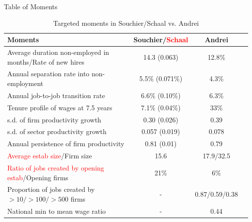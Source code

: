 \documentclass[9pt,aspectratio=169]{beamer} %
\begin{document}
\begin{frame}[noframenumbering]{Table of Moments}
    \begin{table}[h!]
\centering
\begin{tabular}{lccc}
\hline
Moments & Souchier/\textcolor{red}{Schaal} & Andrei \\
\hline
\hline
Average duration non-employed in months/Rate of new hires & 14.3 (0.063) &  12.8\%\\
\hline
Annual separation rate into non-employment & 5.5\% (0.071\%) & 4.3\% \\
\hline
Annual job-to-job transition rate & 6.6\% (0.10\%) & 6.3\% \\
\hline \hline
Tenure profile of wages at 7.5 years & 7.1\% (0.04\%) & 33\% \\

\hline \hline
s.d. of firm productivity growth & 0.30 (0.026) & 0.39 \\
\hline
s.d. of sector productivity growth & 0.057 (0.019) & 0.078 \\
\hline
Annual persistence of firm productivity & 0.81 (0.01) & 0.79 \\
\hline \hline
\textcolor{red}{Average estab size}/Firm size & 15.6& 17.9/32.5\\
\hline
\textcolor{red}{Ratio of jobs created by opening estab}/Opening firms & 21\% & 6\%\\
\hline
Proportion of jobs created by $>10/>100/>500$ firms &- & 0.87/0.59/0.38 \\
\hline \hline
National min to mean wage ratio & - &  0.44\\
\hline \hline 
\end{tabular}
\caption{Targeted moments in Souchier/Schaal vs. Andrei}

\end{table}
\hyperlink{Param}{}
\end{frame}
\end{document}
